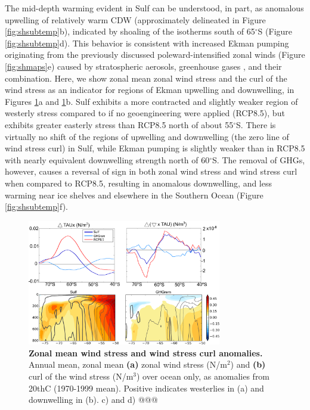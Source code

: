 \documentclass[grl]{AGUTeX}  %
\begin{document}
\begin{article}
The mid-depth warming evident in Sulf can be understood, in part, as anomalous upwelling of relatively warm CDW (approximately delineated in Figure \ref{fig:shsubtemp}b), indicated by shoaling of the isotherms south of 65$^\circ$S (Figure \ref{fig:shsubtemp}d). This behavior is consistent with increased Ekman pumping originating from the previously discussed poleward-intensified zonal winds (Figure \ref{fig:shmaps}e) caused by stratospheric aerosols, greenhouse gases \citep{fyfe07}, and their combination. Here, we show zonal mean zonal wind stress and the curl of the wind stress as an indicator for regions of Ekman upwelling and downwelling, in Figures \ref{fig:zmtau}a and \ref{fig:zmtau}b. Sulf exhibits a more contracted and slightly weaker region of westerly stress compared to if no geoengineering were applied (RCP8.5), but exhibits greater easterly stress than RCP8.5 north of about 55$^\circ$S. There is virtually no shift of the regions of upwelling and downwelling (the zero line of wind stress curl) in Sulf, while Ekman pumping is slightly weaker than in RCP8.5 with nearly equivalent downwelling strength north of 60$^\circ$S. The removal of GHGs, however, causes a reversal of sign in both zonal wind stress and wind stress curl when compared to RCP8.5, resulting in anomalous downwelling, and less warming near ice shelves and elsewhere in the Southern Ocean (Figure \ref{fig:shsubtemp}f).  

\begin{figure}[htbp] %
\centering
 \noindent\includegraphics[width=20pc]{figures/TAUcurl_TEMPanomMOCeddy+eul.pdf}
\caption{\textbf{Zonal mean wind stress and wind stress curl anomalies.} Annual mean, zonal mean \textbf{(a)} zonal wind stress (N/m$^2$) and \textbf{(b)} curl of the wind stress (N/m$^3$) over ocean only, as anomalies from 20thC (1970-1999 mean). Positive indicates westerlies in (a) and downwelling in (b). c) and d) @@@}
\label{fig:zmtau}
\end{figure}



\end{article}
\end{document}
